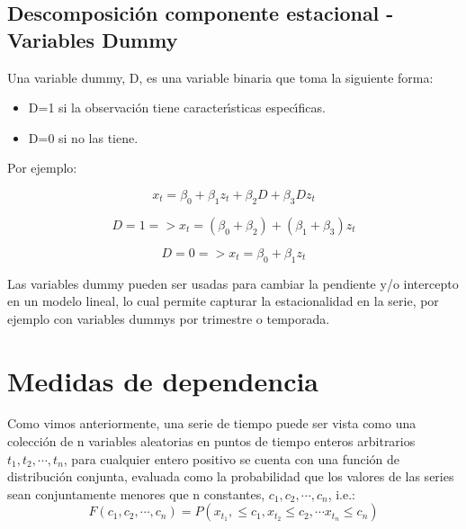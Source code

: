\subsection{Descomposici\'on componente estacional - Variables Dummy}
Una variable dummy, D, es una variable binaria que toma la siguiente forma:

\begin{itemize}
	\item D=1  si la observaci\'on tiene caracter\'\i{}sticas espec\'\i{}ficas.
	\item D=0 si no las tiene.
\end{itemize}

Por ejemplo:

\begin{equation*}
x_t  = \beta_0 + \beta_1 z_t + \beta_2 D + \beta_3 D z_t
\end{equation*}

\begin{equation*}
D=1 => x_t  = (\beta_0 + \beta_2) + (\beta_1 + \beta_3) z_t
\end{equation*}

\begin{equation*}
D=0 => x_t  = \beta_0 + \beta_1 z_t
\end{equation*}

Las variables dummy pueden ser usadas para cambiar la pendiente y/o intercepto en un modelo lineal, lo cual permite capturar la estacionalidad en la serie, por ejemplo con variables dummys por trimestre o temporada.
\pagebreak\section{Medidas de dependencia}
	Como vimos anteriormente, una serie de tiempo puede ser vista como una colecci\'on de n variables aleatorias en puntos de tiempo enteros arbitrarios $t_1, t_2,\cdots, t_n$, para cualquier entero positivo se cuenta con una funci\'on de distribuci\'on conjunta, evaluada como la probabilidad que los valores de las series sean conjuntamente menores que n constantes, $c_1, c_2,\cdots, c_n$, i.e.:
	\begin{equation*}
	F(c_1, c_2,\cdots, c_n) =  P(x_{t_1},\le c_1, x_{t_2} 	\le c_2,\cdots x_{t_n} \le c_n)
	\end{equation*}

